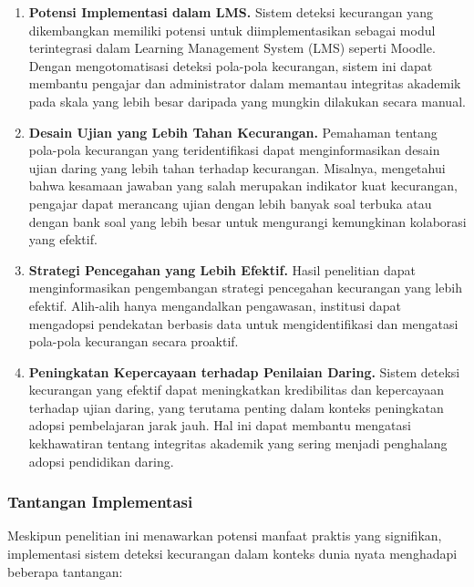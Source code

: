 \begin{enumerate}
    \item \textbf{Potensi Implementasi dalam LMS.} Sistem deteksi kecurangan yang dikembangkan memiliki potensi untuk diimplementasikan sebagai modul terintegrasi dalam Learning Management System (LMS) seperti Moodle. Dengan mengotomatisasi deteksi pola-pola kecurangan, sistem ini dapat membantu pengajar dan administrator dalam memantau integritas akademik pada skala yang lebih besar daripada yang mungkin dilakukan secara manual.

    \item \textbf{Desain Ujian yang Lebih Tahan Kecurangan.} Pemahaman tentang pola-pola kecurangan yang teridentifikasi dapat menginformasikan desain ujian daring yang lebih tahan terhadap kecurangan. Misalnya, mengetahui bahwa kesamaan jawaban yang salah merupakan indikator kuat kecurangan, pengajar dapat merancang ujian dengan lebih banyak soal terbuka atau dengan bank soal yang lebih besar untuk mengurangi kemungkinan kolaborasi yang efektif.

    \item \textbf{Strategi Pencegahan yang Lebih Efektif.} Hasil penelitian dapat menginformasikan pengembangan strategi pencegahan kecurangan yang lebih efektif. Alih-alih hanya mengandalkan pengawasan, institusi dapat mengadopsi pendekatan berbasis data untuk mengidentifikasi dan mengatasi pola-pola kecurangan secara proaktif.

    \item \textbf{Peningkatan Kepercayaan terhadap Penilaian Daring.} Sistem deteksi kecurangan yang efektif dapat meningkatkan kredibilitas dan kepercayaan terhadap ujian daring, yang terutama penting dalam konteks peningkatan adopsi pembelajaran jarak jauh. Hal ini dapat membantu mengatasi kekhawatiran tentang integritas akademik yang sering menjadi penghalang adopsi pendidikan daring.
\end{enumerate}

\subsubsection{Tantangan Implementasi}

Meskipun penelitian ini menawarkan potensi manfaat praktis yang signifikan, implementasi sistem deteksi kecurangan dalam konteks dunia nyata menghadapi beberapa tantangan:


